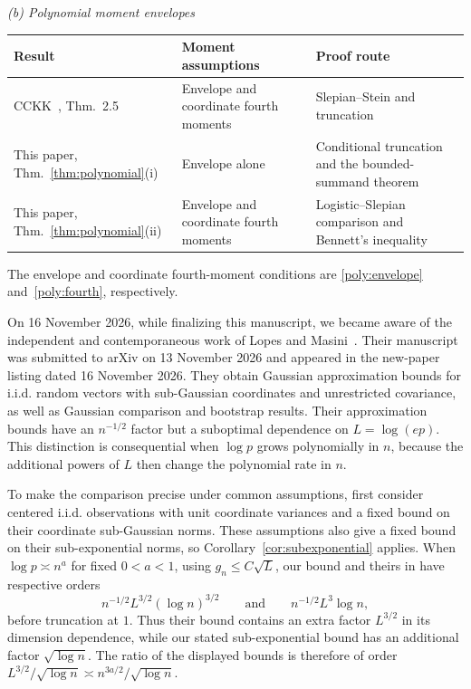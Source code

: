 \documentclass[11pt,letterpaper,twoside,leqno]{article}
\theoremstyle{bookplain}
\theoremstyle{bookremark}
\begin{document}
\begin{table}[!htb]
\medskip
\textit{(b) Polynomial moment envelopes}\par\smallskip
\begin{tabularx}{\textwidth}{@{}>{\raggedright\arraybackslash}p{}
 >{\raggedright\arraybackslash}p{}
 >{\raggedright\arraybackslash}X@{}}
\toprule
Result & Moment assumptions & Proof route \\
\midrule
CCKK~\cite{CCKK2022}, Thm.~2.5 & Envelope and coordinate fourth moments & Slepian--Stein and truncation \\[2pt]
This paper, Thm.~\ref{thm:polynomial}(i) & Envelope alone & Conditional truncation and the bounded-summand theorem \\[2pt]
This paper, Thm.~\ref{thm:polynomial}(ii) & Envelope and coordinate fourth moments & Logistic--Slepian comparison and Bennett's inequality \\
\bottomrule
\end{tabularx}
\smallskip
{\footnotesize\raggedright
The envelope and coordinate fourth-moment conditions are
\eqref{poly:envelope} and~\eqref{poly:fourth}, respectively.\par}
\end{table}

On 16 November 2026, while finalizing this manuscript, we became aware
of the independent and contemporaneous work of Lopes and
Masini~\cite{LopesMasini2026}. Their manuscript was submitted to arXiv
on 13 November 2026 and appeared in the new-paper listing dated
16 November 2026. They obtain Gaussian approximation bounds for i.i.d.
random vectors with sub-Gaussian coordinates and unrestricted covariance,
as well as Gaussian comparison and bootstrap results. Their approximation
bounds have an \(n^{-1/2}\) factor but a suboptimal dependence on
\(L=\log(ep)\). This distinction is consequential when \(\log p\)
grows polynomially in \(n\), because the additional powers of \(L\)
then change the polynomial rate in \(n\).

To make the comparison precise under common assumptions, first consider
centered i.i.d. observations with unit coordinate variances and a fixed
bound on their coordinate sub-Gaussian norms. These assumptions also
give a fixed bound on their sub-exponential norms, so
Corollary~\ref{cor:subexponential} applies. When
\(\log p\asymp n^a\) for fixed \(0<a<1\), using
\(g_n\le C\sqrt L\), our bound and theirs in
\cite[Theorem~2.1]{LopesMasini2026} have respective orders
\[
 n^{-1/2}L^{3/2}(\log n)^{3/2}
 \qquad\text{and}\qquad
 n^{-1/2}L^3\log n,
\]
before truncation at \(1\). Thus their bound contains an extra
factor \(L^{3/2}\) in its dimension dependence, while our stated
sub-exponential bound has an additional factor \(\sqrt{\log n}\).
The ratio of the displayed bounds is therefore of order
\(L^{3/2}/\sqrt{\log n}\asymp n^{3a/2}/\sqrt{\log n}\).
\end{document}
